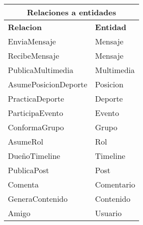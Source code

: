 \begin{table}[h]
\begin{tabular}{|l|l|l|l|}
\multicolumn{4}{|c|}{\textbf{Relaciones a entidades}} \\ \hline
\multicolumn{2}{|l|}{\textbf{Relacion}} & \multicolumn{2}{l|}{\textbf{Entidad}} \\ \hline
\multicolumn{2}{|l|}{EnviaMensaje} & \multicolumn{2}{l|}{Mensaje} \\ \hline
\multicolumn{2}{|l|}{RecibeMensaje} & \multicolumn{2}{l|}{Mensaje} \\ \hline
\multicolumn{2}{|l|}{PublicaMultimedia} & \multicolumn{2}{l|}{Multimedia} \\ \hline
\multicolumn{2}{|l|}{AsumePosicionDeporte} & \multicolumn{2}{l|}{Posicion} \\ \hline
\multicolumn{2}{|l|}{PracticaDeporte} & \multicolumn{2}{l|}{Deporte} \\ \hline
\multicolumn{2}{|l|}{ParticipaEvento} & \multicolumn{2}{l|}{Evento} \\ \hline
\multicolumn{2}{|l|}{ConformaGrupo} & \multicolumn{2}{l|}{Grupo} \\ \hline
\multicolumn{2}{|l|}{AsumeRol} & \multicolumn{2}{l|}{Rol} \\ \hline
\multicolumn{2}{|l|}{DueñoTimeline} & \multicolumn{2}{l|}{Timeline} \\ \hline
\multicolumn{2}{|l|}{PublicaPost} & \multicolumn{2}{l|}{Post} \\ \hline
\multicolumn{2}{|l|}{Comenta} & \multicolumn{2}{l|}{Comentario} \\ \hline
\multicolumn{2}{|l|}{GeneraContenido} & \multicolumn{2}{l|}{Contenido} \\ \hline
\multicolumn{2}{|l|}{Amigo} & \multicolumn{2}{l|}{Usuario} \\ \hline
\end{tabular}
\end{table}